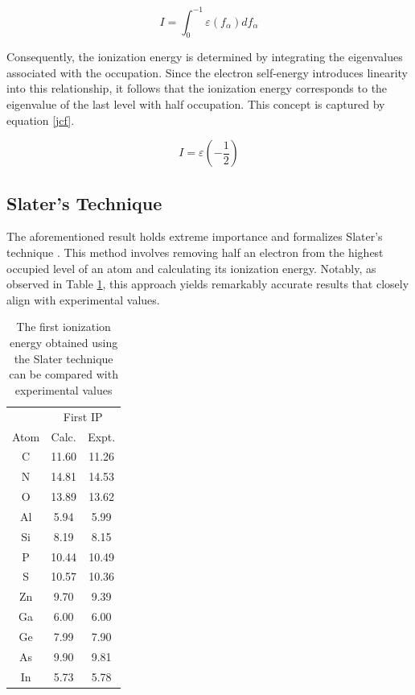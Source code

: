 \begin{equation}
\label{iejt}
    I = \int _{0} ^{-1} \varepsilon (f_{\alpha}) d f_{\alpha} 
\end{equation}

Consequently, the ionization energy is determined by integrating the eigenvalues associated with the occupation. Since the electron self-energy introduces linearity into this relationship, it follows that the ionization energy corresponds to the eigenvalue of the last level with half occupation. This concept is captured by equation \ref{jcf}.

\begin{equation}
\label{jcf}
    I = \varepsilon (-\frac{1}{2})
\end{equation}

\subsection{Slater's Technique}
The aforementioned result holds extreme importance and formalizes Slater's technique \cite{PhysRevB.5.844}\cite{SLATER19721}. This method involves removing half an electron from the highest occupied level of an atom and calculating its ionization energy. Notably, as observed in Table \ref{tab:sr}, this approach yields remarkably accurate results that closely align with experimental values.
\begin{table}[htbp]
\centering

\caption{The first ionization energy obtained using the Slater technique can be compared with experimental values\cite{PhysRevB.78.125116}}
\begin{tabular}{ c c c}
\hline
\hline
 & \multicolumn{2}{c}{First IP} \\
Atom & Calc.  & Expt. \\ \hline
C  & 11.60   & 11.26 \\ 
N  & 14.81  & 14.53 \\ 
O  & 13.89  & 13.62 \\
Al  & 5.94   & 5.99 \\ 
Si  & 8.19   & 8.15 \\ 
P  & 10.44  & 10.49 \\
S  & 10.57   & 10.36 \\ 
Zn  & 9.70  & 9.39 \\ 
Ga  & 6.00  & 6.00 \\
Ge  & 7.99   & 7.90 \\ 
As  & 9.90  & 9.81 \\ 
In  & 5.73  & 5.78 \\
\hline
\hline
\end{tabular}
\label{tab:sr}
\end{table}




